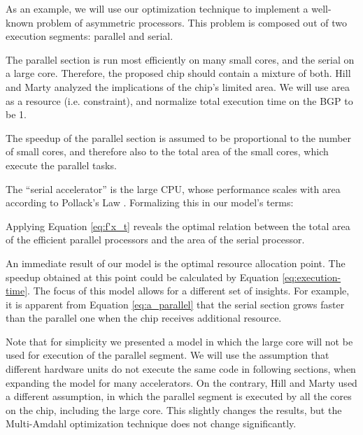 \documentclass[twocolumn,english]{IEEEtran}
\begin{document}
As an example, we will use our optimization technique to implement
a well-known problem of asymmetric processors. This problem is composed
out of two execution segments: parallel and serial.




The parallel section is run most efficiently on many small cores,
and the serial on a large core. Therefore, the proposed chip should
contain a mixture of both. Hill and Marty \cite{hill2008amdahl} analyzed
the implications of the chip\textquoteright{}s limited area. We will
use area as a resource (i.e. constraint), and normalize total execution
time on the BGP to be 1. 




The speedup of the parallel section is assumed to be proportional
to the number of small cores, and therefore also to the total area
of the small cores, which execute the parallel tasks.




The {}``serial accelerator'' is the large CPU, whose performance
scales with area according to Pollack's Law \cite{Newmicroarchi}.
Formalizing this in our model's terms:




Applying Equation \eqref{eq:f'x_t} reveals the optimal relation between
the total area of the efficient parallel processors and the area of
the serial processor.




An immediate result of our model is the optimal resource allocation
point. The speedup obtained at this point could be calculated by Equation
\eqref{eq:execution-time}. The focus of this model allows for a different
set of insights. For example, it is apparent from Equation \eqref{eq:a_parallel}
that the serial section grows faster than the parallel one when the
chip receives additional resource. 

Note that for simplicity we presented a model in which the large core
will not be used for execution of the parallel segment. We will use
the assumption that different hardware units do not execute the same
code in following sections, when expanding the model for many accelerators.
On the contrary, Hill and Marty \cite{hill2008amdahl} used a different
assumption, in which the parallel segment is executed by all the cores
on the chip, including the large core. This slightly changes the results,
but the Multi-Amdahl optimization technique does not change significantly. 
\end{document}
